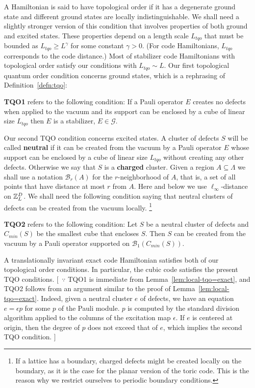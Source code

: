 A Hamiltonian is  said to have topological order if it
has a degenerate ground state and different ground states are locally indistinguishable.
We shall need a slightly stronger version of this condition
that involves properties of both ground and excited states.
These properties depend on a length scale $L_{tqo}$ that must
be bounded as $L_{tqo}\ge  L^\gamma$ for some constant $\gamma>0$.
(For code Hamiltonians, $L_{tqo}$ corresponds to the code distance.)
Most of stabilizer code Hamiltonians with topological order satisfy our conditions
with $L_{tqo} \sim L$.
Our first topological quantum order condition concerns ground states,
which is a rephrasing of Definition~\ref{defn:tqo}:
\begin{defn}
\label{defn:TQO1}
{\bf TQO1} refers to the following condition: 
If a Pauli operator $E$ creates no defects when applied to the vacuum
and its support can be enclosed by a cube of linear size $L_{tqo}$ then $E$
is a stabilizer,  $E\in \mathcal G$.
\end{defn}
Our second TQO condition concerns excited states.
A cluster of defects $S$ will be called {\bf neutral} if it can be created
from the vacuum by a Pauli operator $E$ whose support can be enclosed
by a cube of linear size $L_{tqo}$ without creating any other defects.
Otherwise we say that $S$ is a {\bf charged} cluster.
Given a region $A \subseteq \Lambda$ we shall use a notation
$\mathcal B _r(A)$ for the $r$-neighborhood of $A$, that is, a set of all points that have distance at most $r$ from $A$.
Here and below we use $\ell_{\infty}$-distance on $\mathbb{Z}_L^D$.
We shall need the following condition saying that neutral clusters of defects can be
created from the vacuum locally.%
\footnote{If a lattice has a boundary, charged defects
might be created locally on the boundary, as it is the case for the planar version of the toric
code. This is the reason why we restrict ourselves to periodic boundary conditions.}
\begin{defn}
\label{defn:TQO2}
{\bf TQO2} refers to the following condition:
Let $S$ be a neutral cluster of defects 
and $C_{min}(S)$ be the smallest cube that encloses $S$.
Then $S$ can be created from the vacuum 
by a Pauli operator supported on $\mathcal B_1(C_{min}(S))$.
\end{defn}
%
%
\begin{rem}
\label{rem:TransInv-strongTQO}
A translationally invariant exact code Hamiltonian satisfies
both of our topological order conditions.
In particular, the cubic code satisfies the present TQO conditions.
[~$\because$
TQO1 is immediate from Lemma~\ref{lem:local-tqo=exact},
and TQO2 follows from an argument similar to the proof of Lemma~\ref{lem:local-tqo=exact}.
Indeed, given a neutral cluster $e$ of defects,
we have an equation $e = \epsilon p$ for some $p$ of the Pauli module.
$p$ is computed by the standard division algorithm applied to the columns of
the excitation map $\epsilon$.
If $e$ is centered at origin, then the degree of $p$ does not exceed
that of $e$, which implies the second TQO condition.%
]
\end{rem}


